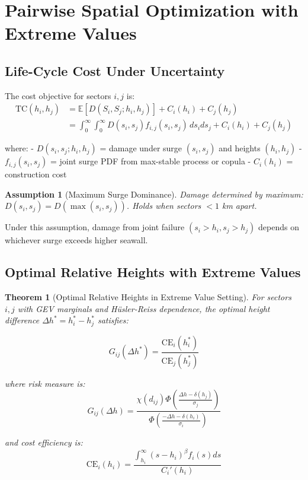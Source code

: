 \documentclass[review]{elsarticle}
\newtheorem{theorem}{Theorem}[section]
\newtheorem{assumption}{Assumption}[section]
\begin{document}
\section{Pairwise Spatial Optimization with Extreme Values}

\subsection{Life-Cycle Cost Under Uncertainty}

The cost objective for sectors $i,j$ is:
\begin{align}
\text{TC}(h_i,h_j) &= \mathbb{E}[D(S_i,S_j; h_i,h_j)] + C_i(h_i) + C_j(h_j)\\
&= \int_0^\infty \int_0^\infty D(s_i,s_j) f_{i,j}(s_i,s_j) \, ds_i ds_j + C_i(h_i) + C_j(h_j)
\label{eq:lc_cost}
\end{align}

where:
- $D(s_i,s_j; h_i,h_j)$ = damage under surge $(s_i,s_j)$ and heights $(h_i,h_j)$
- $f_{i,j}(s_i,s_j)$ = joint surge PDF from max-stable process or copula
- $C_i(h_i)$ = construction cost

\begin{assumption}[Maximum Surge Dominance]
Damage determined by maximum: $D(s_i,s_j) = D(\max(s_i,s_j))$. Holds when sectors $<1$ km apart.
\end{assumption}

Under this assumption, damage from joint failure $(s_i > h_i, s_j > h_j)$ depends on whichever surge exceeds higher seawall.

\subsection{Optimal Relative Heights with Extreme Values}

\begin{theorem}[Optimal Relative Heights in Extreme Value Setting]
\label{thm:optimal_relative}
For sectors $i,j$ with GEV marginals and Hüsler-Reiss dependence, the optimal height difference $\Delta h^* = h_i^* - h_j^*$ satisfies:

\begin{equation}
G_{ij}(\Delta h^*) = \frac{\text{CE}_i(h_i^*)}{\text{CE}_j(h_j^*)}
\label{eq:optimal_relative}
\end{equation}

where risk measure is:
\begin{equation}
G_{ij}(\Delta h) = \frac{\chi(d_{ij}) \Phi\left(\frac{\Delta h - \delta(h_j)}{\sigma_j}\right)}{\Phi\left(\frac{-\Delta h - \delta(h_i)}{\sigma_i}\right)}
\label{eq:risk_measure_ev}
\end{equation}

and cost efficiency is:
\begin{equation}
\text{CE}_i(h_i) = \frac{\int_{h_i}^\infty (s-h_i)^\beta f_i(s) ds}{C_i'(h_i)}
\label{eq:cost_eff_ev}
\end{equation}
\end{theorem}
\end{document}
